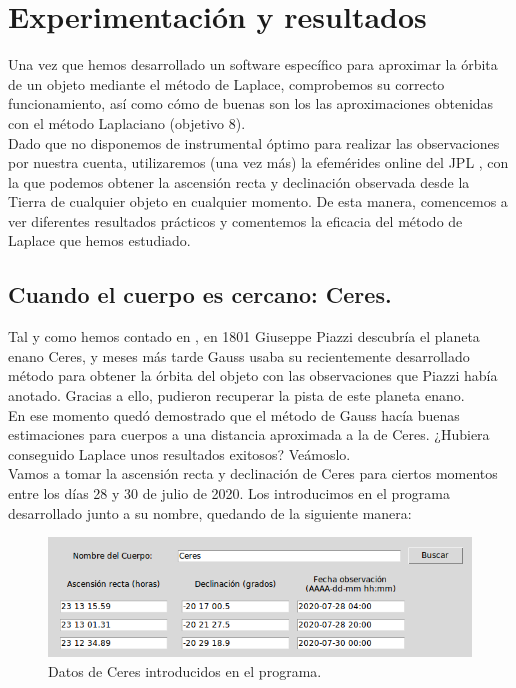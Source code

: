 
\chapter{Experimentación y resultados}
\label{chap:experimentation}
Una vez que hemos desarrollado un software específico para aproximar la órbita de un objeto mediante el método de Laplace, comprobemos su correcto funcionamiento, así como cómo de buenas son los las aproximaciones obtenidas con el método Laplaciano (objetivo 8).\\

Dado que no disponemos de instrumental óptimo para realizar las observaciones por nuestra cuenta, utilizaremos (una vez más) la efemérides online del JPL \cite{jpl}, con la que podemos obtener la ascensión recta y declinación observada desde la Tierra de cualquier objeto en cualquier momento. De esta manera, comencemos a ver diferentes resultados prácticos y comentemos la eficacia del método de Laplace que hemos estudiado.\\

\section{Cuando el cuerpo es cercano: Ceres.}
\label{sec:exp_ceres}
Tal y como hemos contado en \label{sec:history}, en 1801 Giuseppe Piazzi descubría el planeta enano Ceres, y meses más tarde Gauss usaba su recientemente desarrollado método para obtener la órbita del objeto con las observaciones que Piazzi había anotado. Gracias a ello, pudieron recuperar la pista de este planeta enano.\\

En ese momento quedó demostrado que el método de Gauss hacía buenas estimaciones para cuerpos a una distancia aproximada a la de Ceres. ¿Hubiera conseguido Laplace unos resultados exitosos? Veámoslo.\\

Vamos a tomar la ascensión recta y declinación de Ceres para ciertos momentos entre los días 28 y 30 de julio de 2020. Los introducimos en el programa desarrollado junto a su nombre, quedando de la siguiente manera:
\begin{figure}[H]
\centering
\includegraphics[scale=0.5]{images/ceres_exp.png}
\caption{Datos de Ceres introducidos en el programa.}
\label{fig:ceres_exp}
\end{figure}

